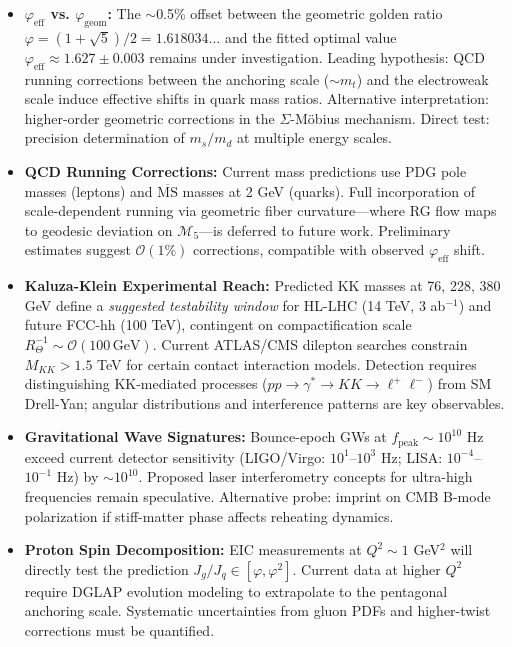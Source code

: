 \documentclass[12pt]{article}
\begin{document}
\begin{itemize}
\item \textbf{$\varphi_{\text{eff}}$ vs. $\varphi_{\text{geom}}$:} The $\sim$0.5\% offset between the geometric golden ratio $\varphi = (1+\sqrt{5})/2 = 1.618034\ldots$ and the fitted optimal value $\varphi_{\text{eff}} \approx 1.627 \pm 0.003$ remains under investigation. Leading hypothesis: QCD running corrections between the anchoring scale ($\sim m_t$) and the electroweak scale induce effective shifts in quark mass ratios. Alternative interpretation: higher-order geometric corrections in the $\Sigma$-M\"obius mechanism. Direct test: precision determination of $m_s/m_d$ at multiple energy scales.

\item \textbf{QCD Running Corrections:} Current mass predictions use PDG pole masses (leptons) and $\overline{\text{MS}}$ masses at 2 GeV (quarks). Full incorporation of scale-dependent running via geometric fiber curvature—where RG flow maps to geodesic deviation on $\mathcal{M}_5$—is deferred to future work. Preliminary estimates suggest $\mathcal{O}(1\%)$ corrections, compatible with observed $\varphi_{\text{eff}}$ shift.

\item \textbf{Kaluza-Klein Experimental Reach:} Predicted KK masses at 76, 228, 380 GeV define a \emph{suggested testability window} for HL-LHC (14 TeV, 3 ab$^{-1}$) and future FCC-hh (100 TeV), contingent on compactification scale $R_\Theta^{-1} \sim \mathcal{O}(100\,\text{GeV})$. Current ATLAS/CMS dilepton searches constrain $M_{KK} > 1.5$ TeV for certain contact interaction models. Detection requires distinguishing KK-mediated processes ($pp \to \gamma^* \to KK \to \ell^+\ell^-$) from SM Drell-Yan; angular distributions and interference patterns are key observables.

\item \textbf{Gravitational Wave Signatures:} Bounce-epoch GWs at $f_{\text{peak}} \sim 10^{10}$ Hz exceed current detector sensitivity (LIGO/Virgo: $10^1$–$10^3$ Hz; LISA: $10^{-4}$–$10^{-1}$ Hz) by $\sim 10^{10}$. Proposed laser interferometry concepts for ultra-high frequencies remain speculative. Alternative probe: imprint on CMB B-mode polarization if stiff-matter phase affects reheating dynamics.

\item \textbf{Proton Spin Decomposition:} EIC measurements at $Q^2 \sim 1$ GeV$^2$ will directly test the prediction $J_g/J_q \in [\varphi, \varphi^2]$. Current data at higher $Q^2$ require DGLAP evolution modeling to extrapolate to the pentagonal anchoring scale. Systematic uncertainties from gluon PDFs and higher-twist corrections must be quantified.


\end{itemize}
\end{document}
